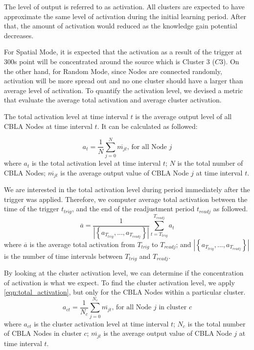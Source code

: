 The level of output is referred to as activation. All clusters are expected to have approximate the same level of activation during the initial learning period. After that, the amount of activation would reduced as the knowledge gain potential decreases. 

For Spatial Mode, it is expected that the activation as a result of the trigger at 300s point will be concentrated around the source which is Cluster 3 ($C3$). On the other hand, for Random Mode, since Nodes are connected randomly, activation will be more spread out and no one cluster should have a larger than average level of activation. To quantify the activation level, we devised a metric that evaluate the average total activation and average cluster activation.


The total activation level at time interval $t$ is the average output level of all CBLA Nodes at time interval $t$. It can be calculated as followed:
 
\begin{equation}\label{eqn:total_activation}
	a_t = \frac{1}{N} \sum_{j=0}^{N} \overline{m_{jt}} \text{, for all Node $j$}
\end{equation}
where $a_t$ is the total activation level at time interval $t$; $N$ is the total number of CBLA Nodes; $\overline{m_{jt}}$ is the average output value of CBLA Node $j$ at time interval $t$.

We are interested in the total activation level during period immediately after the trigger was applied. Therefore, we computer average total activation between the time of the trigger $t_{trig}$, and the end of the readjustment period $t_{readj}$ as followed.
\begin{equation}\label{eqn:average_total_activation}
\overline{a} = \frac{1}{| \left\{ a_{T_{trig}}, ... , a_{T_{readj}} \right\}|} \sum_{t=T_{trig}}^{T_{readj}} a_{t}
\end{equation}
where $\overline{a}$ is the average total activation from $T_{trig}$ to $T_{readj}$; and $| \left\{ a_{T_{trig}}, ..., a_{T_{readj}} \right\}|$ is the number of time intervals between $T_{trig}$ and $T_{readj}$.

By looking at the cluster activation level, we can determine if the concentration of activation is what we expect. 
To find the cluster activation level, we apply \eqref{eqn:total_activation}, but only for the CBLA Nodes within a particular cluster.
\begin{equation}\label{eqn:cluster_activation}
	a_{ct} = \frac{1}{N_c} \sum_{j=0}^{N_c} \overline{m_{jt}} \text{, for all Node $j$ in cluster $c$}
\end{equation}
where $a_{ct}$ is the cluster activation level at time interval $t$; $N_c$ is the total number of CBLA Nodes in cluster $c$; $\overline{m_{jt}}$ is the average output value of CBLA Node $j$ at time interval $t$.


